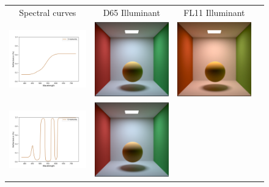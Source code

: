 \begin{itemize}
\begin{figure}[t]
	\centering
	{\sffamily
		\begin{tabular}{cccc}
			Spectral curves & D65 Illuminant & FL11 Illuminant 
			\vspace{1em} \\
			\includegraphics[width=.30\linewidth]{img/metamerism_first_curve.png}
			&
			\includegraphics[width=.30\linewidth]{img/metamerism_first_d65.png}
			& 
			\includegraphics[width=.30\linewidth]{img/metamerism_first_fl11.png}
			\vspace{1em} \\
			\includegraphics[width=.30\linewidth]{img/metamerism_second_curve.png}
			&
			\includegraphics[width=.30\linewidth]{img/metamerism_second_d65.png}

\end{tabular}}
\end{figure}
\end{itemize}
